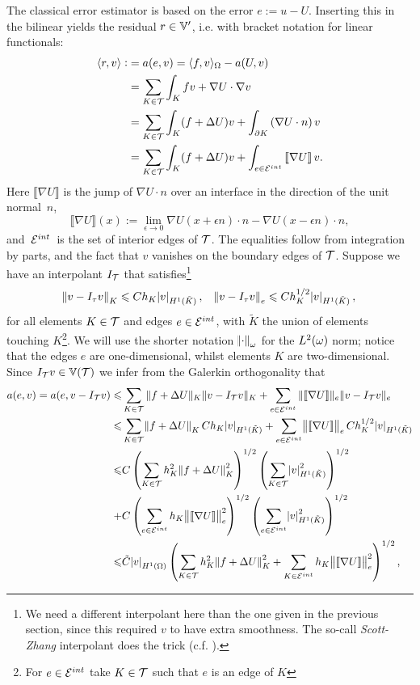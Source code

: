 \documentclass[thesis.tex]{subfiles}
\begin{document}
  The classical error estimator is based on the error $e := u - U$.
  Inserting this in the bilinear yields the residual $r \in \mathbb{V}'$, i.e. with bracket notation for linear functionals:
  \begin{align*}
    \langle r,v \rangle :&= a(e, v) = \langle f,v \rangle_\Omega - a(U, v) \\
              &= \sum_{K \in \mathcal{T}} \int_K fv + \nabla U \cdot \nabla v \\
              &= \sum_{K \in \mathcal{T}} \int_K (f + \Delta U)v+\int_{\partial K} \left(\nabla U \cdot n\right) v\\
    &= \sum_{K \in \mathcal{T}} \int_K (f + \Delta U)v+\int_{e \in \mathcal{E}^{int}} \left \llbracket \nabla U \right \rrbracket  v.
  \end{align*}
  Here $\llbracket \nabla U \rrbracket$ is the jump of $\nabla U \cdot n$ over an interface in the direction of the unit normal~$n$,
  \[
    \llbracket \nabla U \rrbracket(x) := \lim_{\epsilon \to 0} \nabla U(x + \epsilon n) \cdot n - \nabla U(x - \epsilon n)\cdot n,
  \]
  and~$\mathcal{E}^{int}$~is the set of interior edges of $\mathcal{T}$. The equalities follow from integration by parts, and the fact that $v$ vanishes on the boundary edges of $\mathcal{T}$. Suppose we have an interpolant $I_{\mathcal{T}}$ that satisfies\footnote{We need a different interpolant here than the one given in the previous section, since this required $v$ to have extra smoothness. The so-call \emph{Scott-Zhang} interpolant does the trick (c.f. \cite[Ch~4.9]{brenner}).}
  \[
    \norm{v - I_\tau v}_{K} \leqslant C h_K \abs{v}_{H^1(\tilde K)}, \quad \norm{v - I_\tau v}_{e}\leqslant C h_K^{1/2}\abs{v}_{H^1(\tilde K)},
  \]
  for all elements $K \in \mathcal{T}$ and edges $e \in \mathcal{E}^{int}$, with $\tilde K$ the union of elements touching $K$\footnote{For $e \in \mathcal{E}^{int}$ take
  $K \in \mathcal{T}$ such that $e$ is an edge of $K$}.
  We will use the shorter notation $\norm{\cdot}_{\omega}$ for the $L^2(\omega)$ norm; notice that the edges $e$
  are one-dimensional, whilst elements $K$ are two-dimensional. 
  Since $I_{\mathcal{T}} v \in \mathbb{V}(\mathcal{T})$ we infer from the Galerkin orthogonality that
  \begin{align*}
    a(e, v) = a(e, v - I_{\mathcal{T}} v) \leqslant& \sum_{K \in \mathcal{T}} \| f + \Delta U\|_{K} \| v - I_{\mathcal{T}} v\|_{K} + \sum_{e \in \mathcal{E}^{int}} \|\llbracket \nabla U \rrbracket \|_{e} \|v - I_{\mathcal{T}} v\|_{e}\\
    \leqslant& \sum_{K \in \mathcal{T}} \norm{f + \Delta U}_K C h_K  \abs{v}_{H^1(\tilde K)} + \sum_{e \in \mathcal{E}^{int}} \norm{\llbracket \nabla U\rrbracket}_e C h_K^{1/2}\abs{v}_{H^1(\tilde K)}\\
    \leqslant &C \left( \sum_{K \in \mathcal{T}} h_K^2 \norm{f + \Delta U}_{K}^2\right)^{1/2}\left(\sum_{K \in \mathcal{T}}\abs{v}_{H^1(\tilde K)}^2\right)^{1/2} \\
    +&C \left(\sum_{e \in \mathcal{E}^{int}}h_K\norm{\llbracket \nabla U \rrbracket}^2_e\right)^{1/2} \left(\sum_{e \in \mathcal{E}^{int}} \abs{v}^2_{H^1(\tilde K)} \right)^{1/2}\\
    \leqslant &  \tilde C \abs{v}_{H^1(\Omega)} \left(\sum_{K \in \mathcal{T}} h_K^2\norm{f + \Delta U}_K^2 + \sum_{K \in \mathcal{E}^{int}} h_K \norm{\llbracket \nabla U\rrbracket}_e^2 \right)^{1/2},
  \end{align*}
\end{document}
